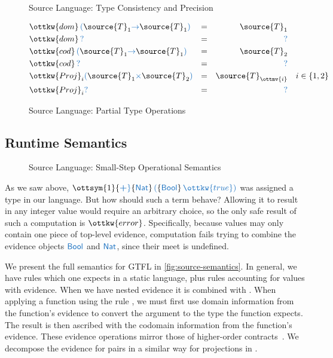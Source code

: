 \documentclass[11pt]{article}
\newcommand{\blue}[1]{ {\color{RoyalBlue}{{#1}}} }
\newcommand{\rrule}[1]{\rref*{#1}}
\begin{document}
\begin{figure}[H]
	\ottdefnConsistent{}
	\ottdefnMeet{}
	\caption{Source Language: Type Consistency and Precision}
	\label{fig:source-precision}
\end{figure}


\begin{figure}[H]
	\begin{align*}
	& \ottkw{dom} \,  \blue{( }  \source{T}_{{\mathrm{1}}} \blue{\to} \source{T}_{{\mathrm{1}}}   \blue{)}  & = && \source{T}_{{\mathrm{1}}} \\ 
	& \ottkw{dom} \,  \blue{?}  & = &&  \blue{?}  \\
	& \ottkw{cod} \,  \blue{( }  \source{T}_{{\mathrm{1}}} \blue{\to} \source{T}_{{\mathrm{1}}}   \blue{)}  & = && \source{T}_{{\mathrm{2}}} \\ 
	& \ottkw{cod} \,  \blue{?}  & = &&  \blue{?}  \\
	&  \ottkw{Proj}_{ i }   \blue{( }  \source{T}_{{\mathrm{1}}} \blue{\times} \source{T}_{{\mathrm{2}}}   \blue{)}   & = && \source{T}_{\ottmv{i}} && i\in\{1,2\} \\ 
	&  \ottkw{Proj}_{ i }   \blue{?}   & = &&  \blue{?}  
	\end{align*}
	\caption{Source Language: Partial Type Operations}
	\label{fig:type-ops} 
\end{figure}

\subsection{Runtime Semantics}

\begin{figure}[H]  
	\ottdefnsSemantics{} 
	\caption{Source Language: Small-Step Operational Semantics}
	\label{fig:source-semantics}
\end{figure}


As we saw above, $ \ottsym{1}  \blue{\boldsymbol{+} }   \{   \blue{\mathsf{Nat} }   \}  \,  \blue{(}   \{   \blue{\mathsf{Bool} }   \}  \,  \blue{ \ottkw{true} }   \blue{)}  $ was assigned a type in our language. But how should such a term behave?
Allowing it to result in any integer value would require an arbitrary choice, so the only safe result
of such a computation is $\ottkw{error}$. Specifically, because values may only contain one piece of top-level evidence, 
computation fails trying to combine the evidence objects $ \blue{\mathsf{Bool} } $ and $ \blue{\mathsf{Nat} } $, since their meet is undefined.

We present the full semantics for GTFL in \autoref{fig:source-semantics}. In general, we have rules which one expects in a static language,
plus rules accounting for values with evidence. When we have nested evidence it is combined with \rrule{RedAscr}. When applying a function
using the rule \rrule{RedAppEv},
we must first use domain information from the function's evidence to convert the argument to the type the function expects.
The result is then ascribed with the codomain information from the function's evidence.
These evidence operations mirror those of higher-order contracts~\citep{Findler:2002:CHF:581478.581484}.
We decompose the evidence for pairs in a similar way for projections in \rrule{RedProjEv}.
\end{document}
